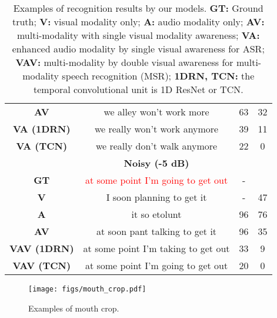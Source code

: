 \documentclass[10pt,twocolumn,letterpaper]{article}
\begin{document}
\begin{table}[h]
\begin{center}
\begin{tabular}{cccc}
{\bf AV} & we alley won't work more&63& 32 \\
{\bf VA (1DRN)} & we really won't work anymore &39& 11 \\
{\bf VA (TCN)} & we really don't walk anymore &22& 0 \\
\midrule
&{\bf Noisy (-5 dB)}&&\\
{\bf GT} & \textcolor{red}{at some point I'm going to get out}  &-&\\
{\bf V} & I soon planning to get it &-& 47 \\
{\bf A} & it so etolunt &96& 76 \\
{\bf AV} & at soon pant talking to get it &96& 35 \\
{\bf VAV (1DRN)} & at some point I'm taking to get out &33& 9 \\
{\bf VAV (TCN)} & at some point I'm going to get out &20& 0 \\
\bottomrule
\end{tabular}
\end{center}
\caption{Examples of recognition results by our models. {\bf GT:} Ground truth; {\bf V:} visual modality only; {\bf A:} audio modality only; {\bf AV:} multi-modality with single visual modality awareness; {\bf VA:} enhanced audio modality by single visual awareness for ASR; {\bf VAV:} multi-modality by double visual awareness for multi-modality speech recognition (MSR); {\bf 1DRN, TCN:} the temporal convolutional unit is 1D ResNet or TCN.}
\label{avsr-example}
        
\end{table}
\vspace{-6pt}
\begin{figure}[t]
\begin{center}
\texttt{[image: figs/mouth\_crop.pdf]}
\end{center}
\caption{Examples of mouth crop. }
\label{fig:mouth_crop}
\vspace{-2pt}
\end{figure}
\end{document}
